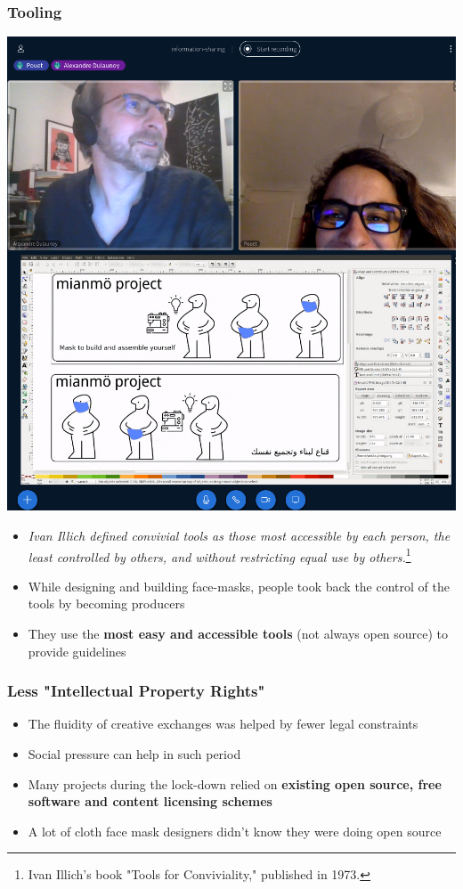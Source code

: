 \documentclass{beamer}
\begin{document}
\begin{frame}[fragile]
        \frametitle{Tooling}
       \begin{multicols}{2}
\null \vfill
\includegraphics[scale=0.16]{./images/pts-ikea2.png}
       \vfill \null
       \columnbreak
       \null \vfill
       \begin{itemize}
		\item {\it \tiny Ivan Illich defined convivial tools as those most accessible by each person, the least controlled by others, and without restricting equal use by others.}\footnote{Ivan Illich’s book "Tools for Conviviality," published in 1973.}
        \item While designing and building face-masks, people took back the control of the tools by becoming producers
        \item They use the {\bf most easy and accessible tools} (not always open source) to provide guidelines
       \end{itemize}
        \vfill \null
\end{multicols}
\end{frame}

\begin{frame}[fragile]
        \frametitle{Less "Intellectual Property Rights"}
        \begin{itemize}
        \item The fluidity of creative exchanges was helped by fewer legal constraints
        \item Social pressure can help in such period
        \item Many projects during the lock-down relied on {\bf existing open source, free software and content licensing schemes}
        \item A lot of cloth face mask designers didn't know they were doing open source
        \end{itemize}

\end{frame}
\end{document}
